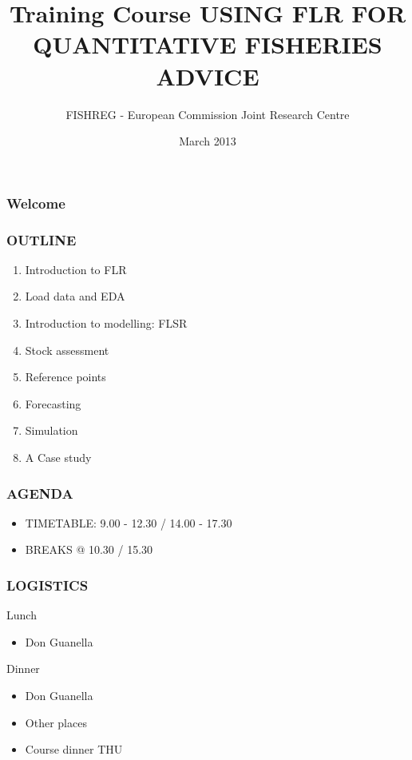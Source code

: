 \documentclass[ignorenonframetext,]{beamer}
\title{Training Course \textbf{USING FLR FOR QUANTITATIVE FISHERIES ADVICE}}
\author{FISHREG - European Commission Joint Research Centre}
\date{March 2013}
\begin{document}
\frame{\titlepage}

\begin{frame}\frametitle{Welcome}

\end{frame}

\begin{frame}\frametitle{OUTLINE}

\begin{enumerate}[<+->][1.]
\item
  Introduction to FLR
\item
  Load data and EDA
\item
  Introduction to modelling: FLSR
\item
  Stock assessment
\item
  Reference points
\item
  Forecasting
\item
  Simulation
\item
  A Case study
\end{enumerate}
\end{frame}

\begin{frame}\frametitle{AGENDA}

\begin{itemize}[<+->]
\item
  TIMETABLE: 9.00 - 12.30 / 14.00 - 17.30
\item
  BREAKS @ 10.30 / 15.30
\end{itemize}
\end{frame}

\begin{frame}\frametitle{LOGISTICS}

\begin{block}{Lunch}

\begin{itemize}[<+->]
\item
  Don Guanella
\end{itemize}
\end{block}

\begin{block}{Dinner}

\begin{itemize}[<+->]
\item
  Don Guanella
\item
  Other places
\item
  Course dinner THU
\end{itemize}
\end{block}

\end{frame}
\end{document}
